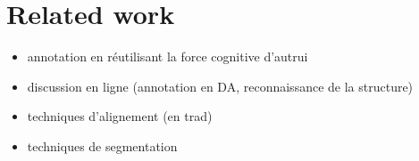\section{Related work}
\label{sec:relatedWork}

\begin{itemize}
\item annotation en réutilisant la force cognitive d'autrui
\item discussion en ligne (annotation en DA, reconnaissance de la structure)
\item  techniques d'alignement (en trad)
\item  techniques de segmentation
\end{itemize}
